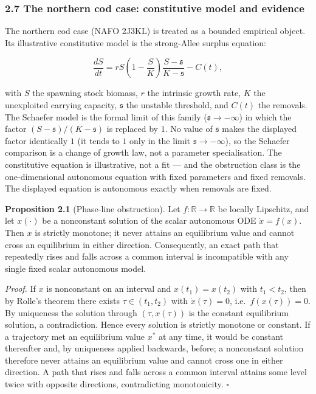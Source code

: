 \documentclass[11pt]{article}
\begin{document}
\subsubsection{2.7 The northern cod case: constitutive model and
evidence}\label{the-northern-cod-case-constitutive-model-and-evidence}

The northern cod case (NAFO 2J3KL) is treated as a bounded empirical
object. Its illustrative constitutive model is the strong-Allee surplus
equation:

\[
\frac{dS}{dt}=rS\left(1-\frac{S}{K}\right)\frac{S-\mathfrak s}{K-\mathfrak s}-C(t),
\tag{5}
\]

with \(S\) the spawning stock biomass, \(r\) the intrinsic growth rate,
\(K\) the unexploited carrying capacity, \(\mathfrak s\) the unstable
threshold, and \(C(t)\) the removals. The Schaefer model is the
formal limit of this family (\(\mathfrak s\to-\infty\)) in which the factor
\((S-\mathfrak s)/(K-\mathfrak s)\) is replaced by \(1\). No value of
\(\mathfrak s\) makes the displayed factor identically \(1\) (it tends
to \(1\) only in the limit \(\mathfrak s\to-\infty\)), so the Schaefer
comparison is a change of growth law, not a parameter specialisation.
The constitutive equation is illustrative, not a fit --- and the obstruction class is the
one-dimensional autonomous equation with fixed parameters and fixed
removals. The displayed equation is autonomous exactly when removals are
fixed.

\textbf{Proposition 2.1} (Phase-line obstruction). Let
\(f:\mathbb{R}\to\mathbb{R}\) be locally Lipschitz, and let \(x(\cdot)\)
be a nonconstant solution of the scalar autonomous ODE \(\dot x=f(x)\).
Then \(x\) is strictly monotone; it never attains an equilibrium value
and cannot cross an equilibrium in either direction. Consequently, an
exact path that repeatedly rises and falls across a common interval is
incompatible with any single fixed scalar autonomous model.

\emph{Proof.} If \(x\) is nonconstant on an interval and
\(x(t_1)=x(t_2)\) with \(t_1<t_2\), then by Rolle's theorem there exists
\(\tau\in(t_1,t_2)\) with \(\dot x(\tau)=0\), i.e.~\(f(x(\tau))=0\). By
uniqueness the solution through \((\tau,x(\tau))\) is the constant
equilibrium solution, a contradiction. Hence every solution is strictly
monotone or constant. If a trajectory met an equilibrium value \(x^*\)
at any time, it would be constant thereafter and, by uniqueness applied
backwards, before; a nonconstant solution therefore never attains an
equilibrium value and cannot cross one in either direction. A path that
rises and falls across a common interval attains some level twice with
opposite directions, contradicting monotonicity. \ensuremath{\square}
\end{document}
